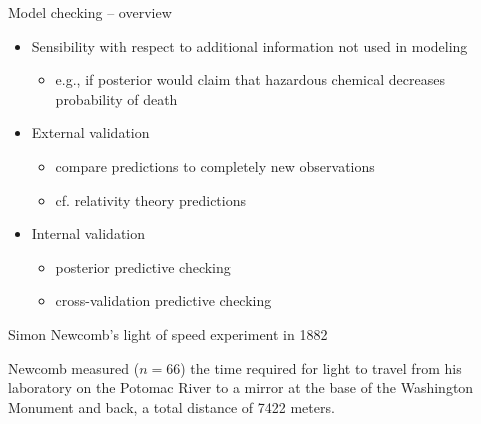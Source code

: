 \documentclass[t]{beamer}
\begin{document}
 \begin{frame}{Model checking -- overview}

  \begin{itemize}
  \item<+-> Sensibility with respect to additional information not used in modeling
    \begin{itemize}
    \item e.g., if posterior would claim that hazardous chemical
      decreases probability of death
    \end{itemize}
  \item<+-> External validation
    \begin{itemize}
    \item compare predictions to completely new observations
    \item cf. relativity theory predictions
    \end{itemize}
  \item<+-> Internal validation
    \begin{itemize}
    \item posterior predictive checking
    \item cross-validation predictive checking
    \end{itemize}
  \end{itemize}

\end{frame}

\begin{frame}
  
  {\large\color{navyblue} Simon Newcomb's light of speed experiment in 1882}

  {\small
  Newcomb measured ($n=66$) the time required for light to travel from
  his laboratory on the Potomac River to a mirror at the base of the
  Washington Monument and back, a total distance of 7422 meters.}

\end{frame}
\end{document}
